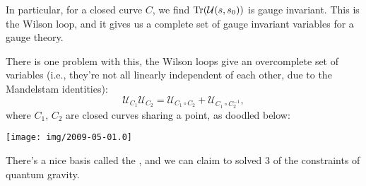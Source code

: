 In particular, for a closed curve $C$, we find
$\operatorname{Tr}(\mathcal{U}(s,s_{0}))$ is gauge invariant. This is the Wilson
loop, and it gives us a complete set of gauge
invariant variables for a gauge theory.

There is one problem with this, the Wilson loops give an overcomplete
set of variables (i.e., they're not all linearly independent of each
other, due to the Mandelstam identities):
\begin{equation}
\mathcal{U}_{C_{1}}\mathcal{U}_{C_{2}}=\mathcal{U}_{C_{1}\circ C_{2}} + \mathcal{U}_{C_{1}\circ C_{2}^{-1}},
\end{equation}
where $C_{1}$, $C_{2}$ are closed curves sharing a point, as doodled
below:
\begin{center}
  \texttt{[image: img/2009-05-01.0]}
\end{center}
There's a nice basis called the , and we can
claim to solved 3 of the constraints of quantum gravity.

